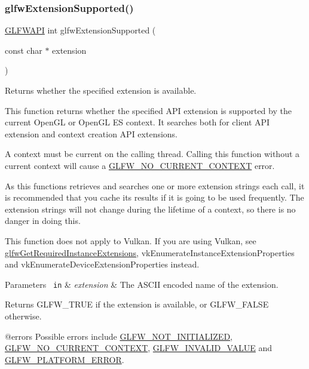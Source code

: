 \subsubsection{\texorpdfstring{glfwExtensionSupported()}{glfwExtensionSupported()}}
{\footnotesize\ttfamily \mbox{\hyperlink{glfw3_8h_a56da5036b2cc259351ae22fd6439bb47}{G\+L\+F\+W\+A\+PI}} int glfw\+Extension\+Supported (\begin{DoxyParamCaption}\item[{const char $\ast$}]{extension }\end{DoxyParamCaption})}



Returns whether the specified extension is available. 

This function returns whether the specified A\+PI extension is supported by the current Open\+GL or Open\+GL ES context. It searches both for client A\+PI extension and context creation A\+PI extensions.

A context must be current on the calling thread. Calling this function without a current context will cause a \mbox{\hyperlink{group__errors_gaa8290386e9528ccb9e42a3a4e16fc0d0}{G\+L\+F\+W\+\_\+\+N\+O\+\_\+\+C\+U\+R\+R\+E\+N\+T\+\_\+\+C\+O\+N\+T\+E\+XT}} error.

As this functions retrieves and searches one or more extension strings each call, it is recommended that you cache its results if it is going to be used frequently. The extension strings will not change during the lifetime of a context, so there is no danger in doing this.

This function does not apply to Vulkan. If you are using Vulkan, see \mbox{\hyperlink{group__vulkan_ga70adaf0cfc99adc484c49ea99e17c2cf}{glfw\+Get\+Required\+Instance\+Extensions}}, {\ttfamily vk\+Enumerate\+Instance\+Extension\+Properties} and {\ttfamily vk\+Enumerate\+Device\+Extension\+Properties} instead.


\begin{DoxyParams}[1]{Parameters}
\mbox{\texttt{ in}}  & {\em extension} & The A\+S\+C\+II encoded name of the extension. \\
\hline
\end{DoxyParams}
\begin{DoxyReturn}{Returns}
{\ttfamily G\+L\+F\+W\+\_\+\+T\+R\+UE} if the extension is available, or {\ttfamily G\+L\+F\+W\+\_\+\+F\+A\+L\+SE} otherwise.
\end{DoxyReturn}
@errors Possible errors include \mbox{\hyperlink{group__errors_ga2374ee02c177f12e1fa76ff3ed15e14a}{G\+L\+F\+W\+\_\+\+N\+O\+T\+\_\+\+I\+N\+I\+T\+I\+A\+L\+I\+Z\+ED}}, \mbox{\hyperlink{group__errors_gaa8290386e9528ccb9e42a3a4e16fc0d0}{G\+L\+F\+W\+\_\+\+N\+O\+\_\+\+C\+U\+R\+R\+E\+N\+T\+\_\+\+C\+O\+N\+T\+E\+XT}}, \mbox{\hyperlink{group__errors_gaaf2ef9aa8202c2b82ac2d921e554c687}{G\+L\+F\+W\+\_\+\+I\+N\+V\+A\+L\+I\+D\+\_\+\+V\+A\+L\+UE}} and \mbox{\hyperlink{group__errors_gad44162d78100ea5e87cdd38426b8c7a1}{G\+L\+F\+W\+\_\+\+P\+L\+A\+T\+F\+O\+R\+M\+\_\+\+E\+R\+R\+OR}}.

